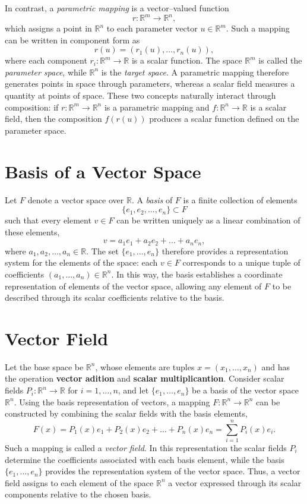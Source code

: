 \documentclass{article}
\begin{document}
	In contrast, a \emph{parametric mapping} is a vector--valued function
	\[
	r : \mathbb{R}^m \to \mathbb{R}^n,
	\]
	which assigns a point in $\mathbb{R}^n$ to each parameter vector $u \in \mathbb{R}^m$. Such a mapping can be written in component form as
	\[
	r(u) = (r_1(u), \dots, r_n(u)),
	\]
	where each component $r_i : \mathbb{R}^m \to \mathbb{R}$ is a scalar function. The space $\mathbb{R}^m$ is called the \emph{parameter space}, while $\mathbb{R}^n$ is the \emph{target space}. A parametric mapping therefore generates points in space through parameters, whereas a scalar field measures a quantity at points of space. These two concepts naturally interact through composition: if $r : \mathbb{R}^m \to \mathbb{R}^n$ is a parametric mapping and $f : \mathbb{R}^n \to \mathbb{R}$ is a scalar field, then the composition $f(r(u))$ produces a scalar function defined on the parameter space.
	
	\section{Basis of a Vector Space}
	
	Let $F$ denote a vector space over $\mathbb{R}$. A \emph{basis} of $F$ is a finite collection of elements
	\[
	\{e_1,e_2,\dots,e_n\}\subset F
	\]
	such that every element $v\in F$ can be written uniquely as a linear combination of these elements,
	\[
	v = a_1 e_1 + a_2 e_2 + \dots + a_n e_n,
	\]
	where $a_1,a_2,\dots,a_n\in\mathbb{R}$. The set $\{e_1,\dots,e_n\}$ therefore provides a representation system for the elements of the space: each $v\in F$ corresponds to a unique tuple of coefficients $(a_1,\dots,a_n)\in\mathbb{R}^n$. In this way, the basis establishes a coordinate representation of elements of the vector space, allowing any element of $F$ to be described through its scalar coefficients relative to the basis.
	
	\section{Vector Field}
	
	Let the base space be $\mathbb{R}^n$, whose elements are tuples $x=(x_1,\dots,x_n)$ and has the operation \textbf{vector adition} and \textbf{scalar multiplicantion}. Consider scalar fields $P_i:\mathbb{R}^n\to\mathbb{R}$ for $i=1,\dots,n$, and let $\{e_1,\dots,e_n\}$ be a basis of the vector space $\mathbb{R}^n$. Using the basis representation of vectors, a mapping $F:\mathbb{R}^n\to\mathbb{R}^n$ can be constructed by combining the scalar fields with the basis elements,
	\[
	F(x)=P_1(x)e_1+P_2(x)e_2+\dots+P_n(x)e_n=\sum_{i=1}^{n}P_i(x)e_i.
	\]
	Such a mapping is called a \emph{vector field}. In this representation the scalar fields $P_i$ determine the coefficients associated with each basis element, while the basis $\{e_1,\dots,e_n\}$ provides the representation system of the vector space. Thus, a vector field assigns to each element of the space $\mathbb{R}^n$ a vector expressed through its scalar components relative to the chosen basis.
	
\end{document}
